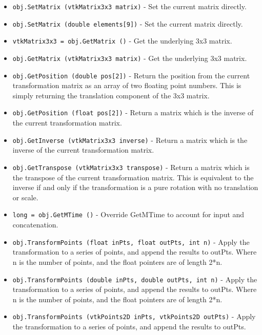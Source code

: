 \begin{itemize}
\item  \verb|obj.SetMatrix (vtkMatrix3x3 matrix)| -  Set the current matrix directly.

\item  \verb|obj.SetMatrix (double elements[9])| -  Set the current matrix directly.

\item  \verb|vtkMatrix3x3 = obj.GetMatrix ()| -  Get the underlying 3x3 matrix.

\item  \verb|obj.GetMatrix (vtkMatrix3x3 matrix)| -  Get the underlying 3x3 matrix.

\item  \verb|obj.GetPosition (double pos[2])| -  Return the position from the current transformation matrix as an array
 of two floating point numbers. This is simply returning the translation
 component of the 3x3 matrix.

\item  \verb|obj.GetPosition (float pos[2])| -  Return a matrix which is the inverse of the current transformation
 matrix.

\item  \verb|obj.GetInverse (vtkMatrix3x3 inverse)| -  Return a matrix which is the inverse of the current transformation
 matrix.

\item  \verb|obj.GetTranspose (vtkMatrix3x3 transpose)| -  Return a matrix which is the transpose of the current transformation
 matrix.  This is equivalent to the inverse if and only if the
 transformation is a pure rotation with no translation or scale.

\item  \verb|long = obj.GetMTime ()| -  Override GetMTime to account for input and concatenation.

\item  \verb|obj.TransformPoints (float inPts, float outPts, int n)| -  Apply the transformation to a series of points, and append the
 results to outPts. Where n is the number of points, and the float pointers
 are of length 2*n.

\item  \verb|obj.TransformPoints (double inPts, double outPts, int n)| -  Apply the transformation to a series of points, and append the
 results to outPts. Where n is the number of points, and the float pointers
 are of length 2*n.

\item  \verb|obj.TransformPoints (vtkPoints2D inPts, vtkPoints2D outPts)| -  Apply the transformation to a series of points, and append the
 results to outPts.


\end{itemize}
